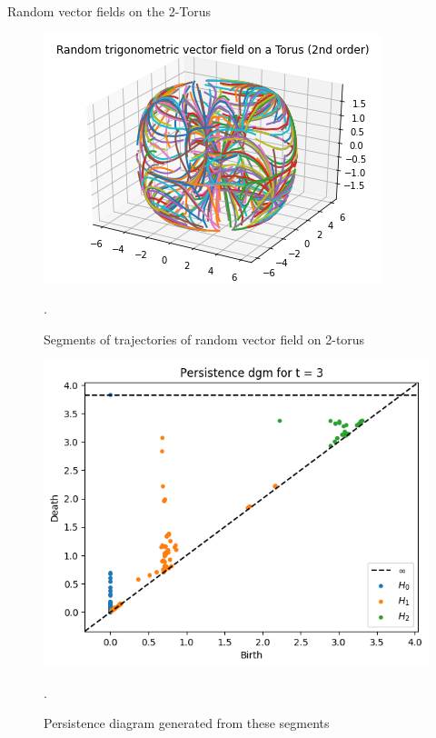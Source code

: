 \documentclass{beamer}
\begin{document}
\begin{frame}{Random vector fields on the 2-Torus}
        \begin{minipage}[b]{0.5\linewidth}
            \begin{figure}
            \includegraphics[width=\textwidth]{../images/torus_2.png}
            \caption{Segments of trajectories of random vector field on 2-torus}.
            \end{figure}
        \end{minipage}
        \hspace{0.5cm}
        \pause
        \begin{minipage}[b]{0.4\linewidth}
            \begin{figure}
            \includegraphics[width=\textwidth]{../images/torus_2_pdgm.png}
            \caption{Persistence diagram generated from these segments}.
            \end{figure}
        \end{minipage}
\end{frame}
\end{document}
